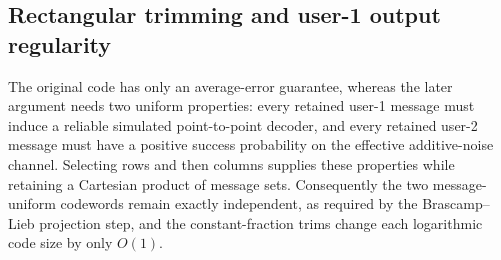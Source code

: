 \documentclass[11pt,onecolumn]{IEEEtran}
\begin{document}
\subsection{Rectangular trimming and user-1 output regularity} \label{sec:trim}
The original code has only an average-error guarantee,
whereas the later argument needs two uniform properties: every retained user-1 message must
induce a reliable simulated point-to-point decoder, and every retained user-2 message must have a
positive success probability on the effective additive-noise channel. Selecting rows and then columns
supplies these properties while retaining a Cartesian product of message sets. Consequently the
two message-uniform codewords remain exactly independent, as required by the Brascamp--Lieb
projection step, and the constant-fraction trims change each logarithmic code size by only $O(1)$.
\end{document}
